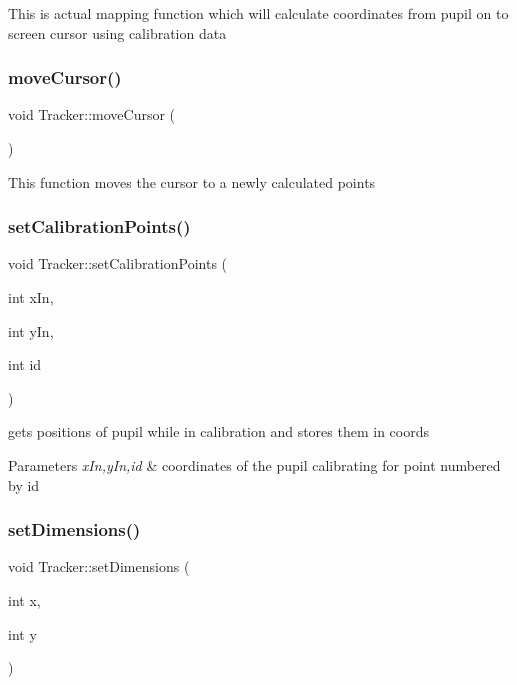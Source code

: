 This is actual mapping function which will calculate coordinates from pupil on to screen cursor using calibration data \mbox{\label{class_tracker_af7d25440cc04a4663a7d09052efa7190}} 
\subsubsection{\texorpdfstring{move\+Cursor()}{moveCursor()}}
{\footnotesize\ttfamily void Tracker\+::move\+Cursor (\begin{DoxyParamCaption}{ }\end{DoxyParamCaption})}

This function moves the cursor to a newly calculated points \mbox{\label{class_tracker_a93d4eb33c16df57689378918ccd606a5}} 
\subsubsection{\texorpdfstring{set\+Calibration\+Points()}{setCalibrationPoints()}}
{\footnotesize\ttfamily void Tracker\+::set\+Calibration\+Points (\begin{DoxyParamCaption}\item[{int}]{x\+In,  }\item[{int}]{y\+In,  }\item[{int}]{id }\end{DoxyParamCaption})}

gets positions of pupil while in calibration and stores them in coords 
\begin{DoxyParams}{Parameters}
{\em x\+In,y\+In,id} & coordinates of the pupil calibrating for point numbered by id \\
\hline
\end{DoxyParams}
\mbox{\label{class_tracker_a4757c0a8b374190c2aa41cb8e4fad132}} 
\subsubsection{\texorpdfstring{set\+Dimensions()}{setDimensions()}}
{\footnotesize\ttfamily void Tracker\+::set\+Dimensions (\begin{DoxyParamCaption}\item[{int}]{x,  }\item[{int}]{y }\end{DoxyParamCaption})}

